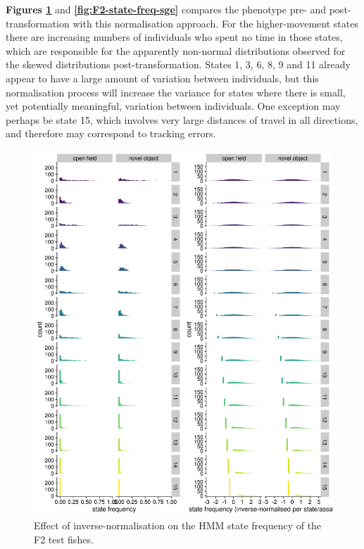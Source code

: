 \documentclass[
]{book}
\begin{document}
\textbf{Figures \ref{fig:F2-state-freq-dge}} and \textbf{\ref{fig:F2-state-freq-sge}} compares the phenotype pre- and post-transformation with this normalisation approach. For the higher-movement states there are increasing numbers of individuals who spent no time in those states, which are responsible for the apparently non-normal distributions observed for the skewed distributions post-transformation. States 1, 3, 6, 8, 9 and 11 already appear to have a large amount of variation between individuals, but this normalisation process will increase the variance for states where there is small, yet potentially meaningful, variation between individuals. One exception may perhaps be state 15, which involves very large distances of travel in all directions, and therefore may correspond to tracking errors.



\begin{figure}
\includegraphics[width=1\linewidth]{figs/mikk_behaviour/0.08_15_state_freq_F2_dge} \caption{Effect of inverse-normalisation on the HMM state frequency of the F2 test fishes.}\label{fig:F2-state-freq-dge}
\end{figure}
\end{document}
